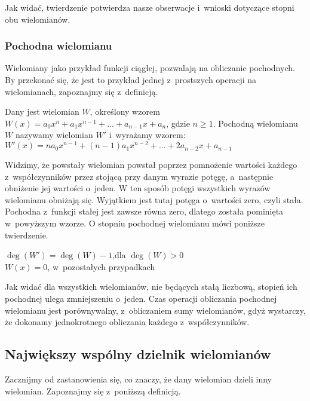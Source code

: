 Jak widać, twierdzenie potwierdza nasze obserwacje i~wnioski dotyczące stopni obu wielomianów.

\subsubsection{Pochodna wielomianu}

Wielomiany jako przykład funkcji ciągłej, pozwalają na obliczanie pochodnych. By przekonać się, że jest to przykład jednej z~prostszych operacji na wielomianach, zapoznajmy się z~definicją.

\begin{definition}
	$ $\\
	Dany jest wielomian $W$, określony wzorem $W(x) = a_0x^n + a_1x^{n-1} + ... + a_{n-1}x + a_n$, gdzie $n\ge1$. Pochodną wielomianu $W$ nazywamy wielomian $W'$ i~wyrażamy wzorem:
	$W'(x) = na_0x^{n-1} + (n-1)a_1x^{n-2} + ... + 2a_{n-2}x + a_{n-1}$
\end{definition}

Widzimy, że powstały wielomian powstał poprzez pomnożenie wartości każdego z~współczynników przez stojącą przy danym wyrazie potęgę, a~następnie obniżenie jej wartości o~jeden. W ten sposób potęgi wszystkich wyrazów wielomianu obniżają się. Wyjątkiem jest tutaj potęga o~wartości zero, czyli stała. Pochodna z~funkcji stałej jest zawsze równa zero, dlatego została pominięta w~powyższym wzorze. O stopniu pochodnej wielomianu mówi poniższe twierdzenie.

\begin{theorem}
	$ $\\
	$\deg(W') = \deg(W) - 1$,dla $\deg(W) > 0$ \\
	$W(x) = 0$, w~pozostałych przypadkach
\end{theorem}

Jak widać dla wszystkich wielomianów, nie będących stałą liczbową, stopień ich pochodnej ulega zmniejszeniu o~jeden. Czas operacji obliczania pochodnej wielomianu jest porównywalny, z~obliczaniem sumy wielomianów, gdyż wystarczy, że dokonamy jednokrotnego obliczania każdego z~współczynników.

\subsection{Największy wspólny dzielnik wielomianów}

Zacznijmy od zastanowienia się, co znaczy, że dany wielomian dzieli inny wielomian. Zapoznajmy się z~poniższą definicją.

